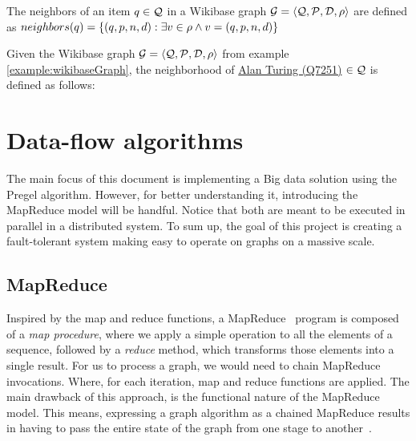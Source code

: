 \begin{definition}
    \label{definition:neighborhood}
    The neighbors of an item $q\in\mathcal{Q}$ in a Wikibase graph $\mathcal{G}=\langle\mathcal{Q},\mathcal{P},\mathcal{D},\rho\rangle$ are defined as $neighbors(q)=\{(q,p,n,d): \exists{}v\in\rho \wedge v=(q,p,n,d)\}$
\end{definition}

\begin{example}
    Given the Wikibase graph $\mathcal{G}=\langle\mathcal{Q},\mathcal{P},\mathcal{D},\rho\rangle$ from example \ref{example:wikibaseGraph}, the neighborhood of \href{https://www.wikidata.org/wiki/Q7251}{Alan Turing (Q7251)} $\in \mathcal{Q}$ is defined as follows:
\end{example}

\begin{table}[ht]
    \centering
    
\end{table}

\section{Data-flow algorithms}

The main focus of this document is implementing a Big data solution using the Pregel algorithm. However, for better understanding it, introducing the MapReduce model will be handful. Notice that both are meant to be executed in parallel in a distributed system. To sum up, the goal of this project is creating a fault-tolerant system making easy to operate on graphs on a massive scale.

\subsection{MapReduce}
\label{section:mapReduce}

Inspired by the map and reduce functions, a MapReduce~\cite{wiki:MapReduce} program is composed of a \textit{map procedure}, where we apply a simple operation to all the elements of a sequence, followed by a \textit{reduce} method, which transforms those elements into a single result. For us to process a graph, we would need to chain MapReduce invocations. Where, for each iteration, map and reduce functions are applied. The main drawback of this approach, is the functional nature of the MapReduce model. This means, expressing a graph algorithm as a chained MapReduce results in having to pass the entire state of the graph from one stage to another~\cite{10.1145/1807167.1807184}.

